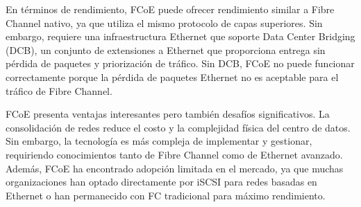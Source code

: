 En términos de rendimiento, FCoE puede ofrecer rendimiento similar a Fibre Channel nativo, ya que utiliza el mismo protocolo de capas superiores. Sin embargo, requiere una infraestructura Ethernet que soporte Data Center Bridging (DCB), un conjunto de extensiones a Ethernet que proporciona entrega sin pérdida de paquetes y priorización de tráfico. Sin DCB, FCoE no puede funcionar correctamente porque la pérdida de paquetes Ethernet no es aceptable para el tráfico de Fibre Channel.

FCoE presenta ventajas interesantes pero también desafíos significativos. La consolidación de redes reduce el costo y la complejidad física del centro de datos. Sin embargo, la tecnología es más compleja de implementar y gestionar, requiriendo conocimientos tanto de Fibre Channel como de Ethernet avanzado. Además, FCoE ha encontrado adopción limitada en el mercado, ya que muchas organizaciones han optado directamente por iSCSI para redes basadas en Ethernet o han permanecido con FC tradicional para máximo rendimiento.